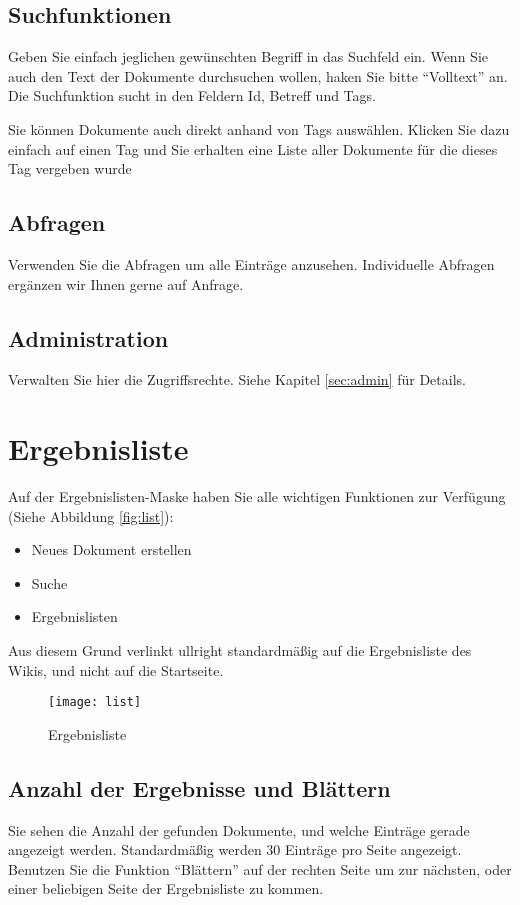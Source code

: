\documentclass[article, a4paper, oneside, 11pt]{memoir}
\begin{document}
\section{Suchfunktionen}
Geben Sie einfach jeglichen gewünschten Begriff in das Suchfeld ein. Wenn Sie auch den Text der Dokumente durchsuchen wollen, haken Sie bitte "`Volltext"' an. Die Suchfunktion sucht in den Feldern Id, Betreff und Tags.

Sie können Dokumente auch direkt anhand von Tags auswählen. Klicken Sie dazu einfach auf einen Tag und Sie erhalten eine Liste aller Dokumente für die dieses Tag vergeben wurde

\section{Abfragen}
Verwenden Sie die Abfragen um alle Einträge anzusehen. Individuelle Abfragen ergänzen wir Ihnen gerne auf Anfrage.

\section{Administration}
Verwalten Sie hier die Zugriffsrechte. Siehe Kapitel \vref{sec:admin} für Details.



\chapter{Ergebnisliste}
Auf der Ergebnislisten-Maske haben Sie alle wichtigen Funktionen zur Verfügung (Siehe Abbildung \vref{fig:list}):

\begin{itemize}
\item Neues Dokument erstellen
\item Suche
\item Ergebnislisten
\end{itemize}
Aus diesem Grund verlinkt ullright standardmäßig auf die Ergebnisliste des Wikis, und nicht auf die Startseite.

\begin{figure}[htp]
\centering
\texttt{[image: list]}
\caption{Ergebnisliste}
\label{fig:list}
\end{figure}


\section{Anzahl der Ergebnisse und Blättern}
Sie sehen die Anzahl der gefunden Dokumente, und welche Einträge gerade angezeigt werden. Standardmäßig werden 30 Einträge pro Seite angezeigt. Benutzen Sie die Funktion "`Blättern"' auf der rechten Seite um zur nächsten, oder einer beliebigen Seite der Ergebnisliste zu kommen.
\end{document}
